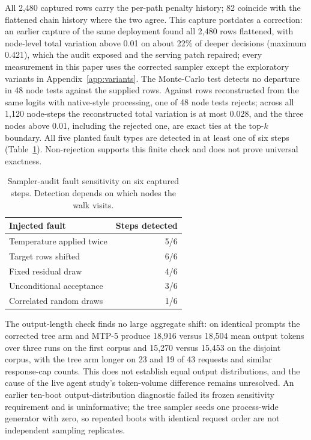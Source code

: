 All 2,480 captured rows carry the per-path penalty history; 82 coincide with the flattened chain history where the two agree. This capture postdates a correction: an earlier capture of the same deployment found all 2,480 rows flattened, with node-level total variation above 0.01 on about 22\% of deeper decisions (maximum 0.421), which the audit exposed and the serving patch repaired; every measurement in this paper uses the corrected sampler except the exploratory variants in Appendix~\ref{app:variants}. The Monte-Carlo test detects no departure in 48 node tests against the supplied rows. Against rows reconstructed from the same logits with native-style processing, one of 48 node tests rejects; across all 1,120 node-steps the reconstructed total variation is at most 0.028, and the three nodes above 0.01, including the rejected one, are exact ties at the top-$k$ boundary. All five planted fault types are detected in at least one of six steps (Table~\ref{tab:sampling-faults}). Non-rejection supports this finite check and does not prove universal exactness.

\begin{table}[t]
\caption{Sampler-audit fault sensitivity on six captured steps. Detection depends on which nodes the walk visits.}
\label{tab:sampling-faults}
\centering\small
\begin{tabular}{@{}lr@{}}
\toprule
Injected fault & Steps detected \\
\midrule
Temperature applied twice & 5/6 \\
Target rows shifted & 6/6 \\
Fixed residual draw & 4/6 \\
Unconditional acceptance & 3/6 \\
Correlated random draws & 1/6 \\
\bottomrule
\end{tabular}
\end{table}

The output-length check finds no large aggregate shift: on identical prompts the corrected tree arm and MTP-5 produce 18,916 versus 18,504 mean output tokens over three runs on the first corpus and 15,270 versus 15,453 on the disjoint corpus, with the tree arm longer on 23 and 19 of 43 requests and similar response-cap counts. This does not establish equal output distributions, and the cause of the live agent study's token-volume difference remains unresolved. An earlier ten-boot output-distribution diagnostic failed its frozen sensitivity requirement and is uninformative; the tree sampler seeds one process-wide generator with zero, so repeated boots with identical request order are not independent sampling replicates.
